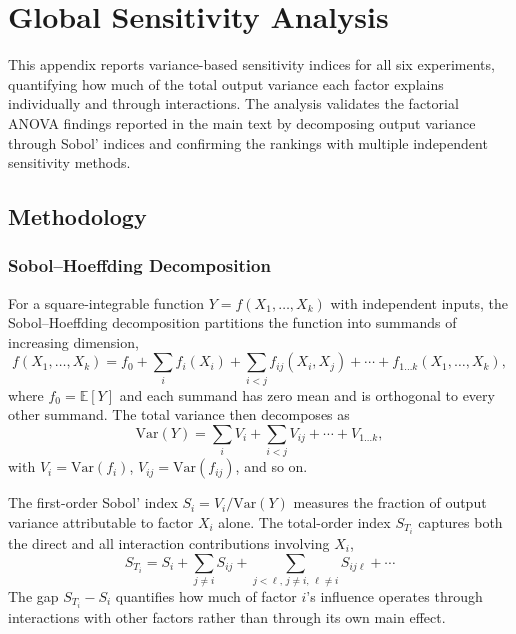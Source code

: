 \section{Global Sensitivity Analysis}
\label{sec:appendix_sensitivity}

This appendix reports variance-based sensitivity indices for all six experiments, quantifying how much of the total output variance each factor explains individually and through interactions. The analysis validates the factorial ANOVA findings reported in the main text by decomposing output variance through Sobol' indices and confirming the rankings with multiple independent sensitivity methods.

\subsection{Methodology}

\subsubsection{Sobol--Hoeffding Decomposition}

For a square-integrable function $Y = f(X_1, \ldots, X_k)$ with independent inputs, the Sobol--Hoeffding decomposition \citep{Sobol2001} partitions the function into summands of increasing dimension,
\begin{equation}
\label{eq:sobol_decomp}
f(X_1, \ldots, X_k) = f_0 + \sum_i f_i(X_i) + \sum_{i<j} f_{ij}(X_i, X_j) + \cdots + f_{1\ldots k}(X_1, \ldots, X_k),
\end{equation}
where $f_0 = \mathbb{E}[Y]$ and each summand has zero mean and is orthogonal to every other summand. The total variance then decomposes as
\begin{equation}
\label{eq:variance_decomp}
\mathrm{Var}(Y) = \sum_i V_i + \sum_{i<j} V_{ij} + \cdots + V_{1\ldots k},
\end{equation}
with $V_i = \mathrm{Var}(f_i)$, $V_{ij} = \mathrm{Var}(f_{ij})$, and so on.

The first-order Sobol' index $S_i = V_i / \mathrm{Var}(Y)$ measures the fraction of output variance attributable to factor $X_i$ alone. The total-order index $S_{T_i}$ captures both the direct and all interaction contributions involving $X_i$,
\begin{equation}
\label{eq:total_order}
S_{T_i} = S_i + \sum_{j \neq i} S_{ij} + \sum_{j < \ell,\, j \neq i,\, \ell \neq i} S_{ij\ell} + \cdots
\end{equation}
The gap $S_{T_i} - S_i$ quantifies how much of factor $i$'s influence operates through interactions with other factors rather than through its own main effect.

